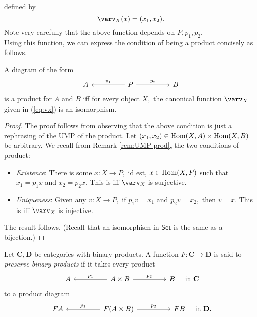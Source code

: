defined by
\begin{equation} \label{eq:vx}
	\varv_X(x) = (x_1, x_2).
\end{equation}
Note very carefully that the above function depends on $P, p_1, p_2.$\\
Using this function, we can express the condition of being a product concisely as follows.
\begin{prop} \label{prop:canonprod}
	A diagram of the form
	\begin{equation*} 
		\begin{tikzcd}
			A && P \arrow[ll, "p_1"'] \arrow[rr, "p_2"] && B
		\end{tikzcd}
	\end{equation*}
	is a product for $A$ and $B$ iff for every object $X,$ the canonical function $\varv_X$ given in (\ref{eq:vx}) is an isomorphism.
\end{prop}
\begin{proof} 
	The proof follows from observing that the above condition is just a rephrasing of the UMP of the product. Let $(x_1, x_2) \in \operatorname{Hom}(X, A) \times \operatorname{Hom}(X, B)$ be arbitrary. We recall from Remark \ref{rem:UMP-prod}, the two conditions of product:
	\begin{itemize}
		\item \emph{Existence}: There is some $x:X\to P,$ id est, $x \in \operatorname{Hom}(X, P)$ such that $x_1 = p_1x$ and $x_2 = p_2x.$ This is iff $\varv_X$ is surjective.
		\item \emph{Uniqueness}: Given any $v:X\to P,$ if $p_1v = x_1$ and $p_2v = x_2,$ then $v = x.$  This is iff $\varv_X$ is injective.
	\end{itemize}
	The result follows. (Recall that an isomorphism in $\mathsf{Set}$ is the same as a bijection.)
\end{proof}
\begin{defn} 
	Let $\mathbf{C}, \mathbf{D}$ be categories with binary products. A function $F:\mathbf{C} \to \mathbf{D}$ is said to \emph{preserve binary products} if it takes every product
	\begin{equation*} 
		\begin{tikzcd}
			A && A \times B \arrow[ll, "p_1"'] \arrow[rr, "p_2"] && B
		\end{tikzcd}
		\quad \text{in }\mathbf{C}
	\end{equation*}
	to a product diagram
	\begin{equation} \label{diag:funcprod}
		\begin{tikzcd}
			FA && F(A \times B) \arrow[ll, "p_1"'] \arrow[rr, "p_2"] && FB
		\end{tikzcd}
		\quad \text{in }\mathbf{D}.
	\end{equation}
\end{defn}
